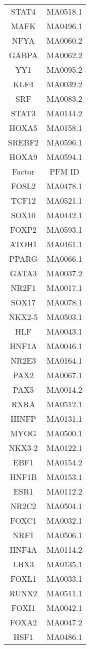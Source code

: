 \begin{multicols}{3}
{{\begin{longtable}{cc}
STAT4 & MA0518.1\\
MAFK & MA0496.1\\
NFYA & MA0060.2\\
GABPA & MA0062.2\\
YY1 & MA0095.2\\
KLF4 & MA0039.2\\
SRF & MA0083.2\\
STAT3 & MA0144.2\\
HOXA5 & MA0158.1\\
SREBF2 & MA0596.1\\
HOXA9 & MA0594.1\\
        \hline
Factor & PFM ID\\
        \hline
FOSL2 & MA0478.1\\
TCF12 & MA0521.1\\
SOX10 & MA0442.1\\
FOXP2 & MA0593.1\\
ATOH1 & MA0461.1\\
PPARG & MA0066.1\\
GATA3 & MA0037.2\\
NR2F1 & MA0017.1\\
SOX17 & MA0078.1\\
NKX2-5 & MA0503.1\\
HLF & MA0043.1\\
HNF1A & MA0046.1\\
NR2E3 & MA0164.1\\
PAX2 & MA0067.1\\
PAX5 & MA0014.2\\
RXRA & MA0512.1\\
HINFP & MA0131.1\\
MYOG & MA0500.1\\
NKX3-2 & MA0122.1\\
EBF1 & MA0154.2\\
HNF1B & MA0153.1\\
ESR1 & MA0112.2\\
NR2C2 & MA0504.1\\
FOXC1 & MA0032.1\\
NRF1 & MA0506.1\\
HNF4A & MA0114.2\\
LHX3 & MA0135.1\\
FOXL1 & MA0033.1\\
RUNX2 & MA0511.1\\
FOXI1 & MA0042.1\\
FOXA2 & MA0047.2\\
HSF1 & MA0486.1\\

\end{longtable}}}
\end{multicols}
